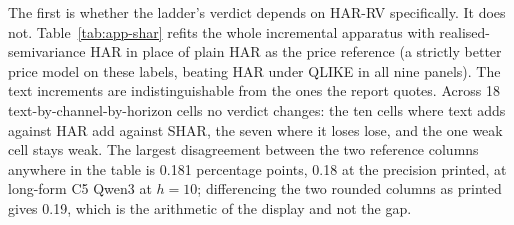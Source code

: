 The first is whether the ladder's verdict depends on HAR-RV specifically.
It does not. Table~\ref{tab:app-shar} refits the whole incremental
apparatus with realised-semivariance HAR in place of plain HAR as the price
reference (a strictly better price model on these labels, beating HAR
under QLIKE in all nine panels). The text increments are
indistinguishable from the ones the report quotes. Across 18 text-by-channel-by-horizon
cells no verdict changes: the ten cells where text adds against HAR add
against SHAR, the seven where it loses lose, and the one weak cell stays
weak. The largest disagreement between the two reference columns anywhere
in the table is 0.181 percentage points, 0.18 at the precision printed, at
long-form C5 Qwen3 at $h{=}10$; differencing the two rounded columns as printed
gives 0.19, which is the arithmetic of the display and not the gap. %


